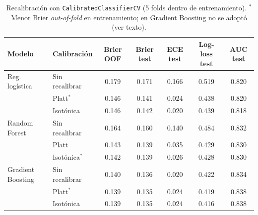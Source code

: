 \begin{table}[!tp]
\centering
\footnotesize
\caption{Recalibración con \texttt{CalibratedClassifierCV} (5 folds dentro de entrenamiento). $^{*}$Menor Brier \textit{out-of-fold} en entrenamiento; en Gradient Boosting no se adoptó (ver texto).}
\label{tab:calibration}
\setlength{\tabcolsep}{4pt}
\begin{tabular}{llccccc}
\toprule
Modelo & Calibración & Brier OOF & Brier test & ECE test & Log-loss test & AUC test \\
\midrule
Reg. logística & Sin recalibrar & 0.179 & 0.171 & 0.166 & 0.519 & 0.820 \\
 & Platt$^{*}$ & 0.146 & 0.141 & 0.024 & 0.438 & 0.820 \\
 & Isotónica & 0.146 & 0.142 & 0.020 & 0.439 & 0.818 \\
Random Forest & Sin recalibrar & 0.164 & 0.160 & 0.140 & 0.484 & 0.832 \\
 & Platt & 0.143 & 0.139 & 0.035 & 0.429 & 0.830 \\
 & Isotónica$^{*}$ & 0.142 & 0.139 & 0.026 & 0.428 & 0.830 \\
Gradient Boosting & Sin recalibrar & 0.140 & 0.136 & 0.020 & 0.422 & 0.834 \\
 & Platt$^{*}$ & 0.139 & 0.135 & 0.024 & 0.419 & 0.838 \\
 & Isotónica & 0.139 & 0.135 & 0.024 & 0.416 & 0.838 \\
\bottomrule
\end{tabular}
\end{table}
